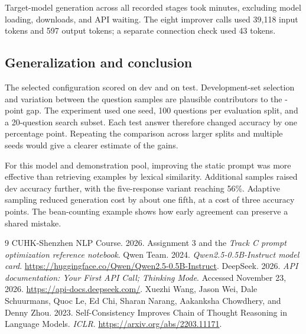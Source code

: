 \documentclass{article}
\begin{document}
Target-model generation across all recorded stages took \LocalMinutes{}
minutes, excluding model loading, downloads, and API waiting.
The eight improver calls used 39,118 input tokens and 597 output tokens;
a separate connection check used 43 tokens.

\subsection{Generalization and conclusion}
The selected configuration scored \FinalDev{} on dev and \FinalTest{} on
test. Development-set selection and variation between the question samples
are plausible contributors to the \FinalGap{}-point gap.
The experiment used one seed, 100 questions per evaluation split, and a
20-question search subset. Each test answer therefore changed accuracy by
one percentage point. Repeating the comparison across larger splits and
multiple seeds would give a clearer estimate of the gains.

For this model and demonstration pool, improving the static prompt was more
effective than retrieving examples by lexical similarity. Additional samples
raised dev accuracy further, with the five-response variant reaching 56\%.
Adaptive sampling reduced generation cost by about one fifth, at a cost of
three accuracy points. The bean-counting example shows how early agreement
can preserve a shared mistake.

\begin{thebibliography}{9}
 CUHK-Shenzhen NLP Course. 2026.
Assignment 3 and the \emph{Track C prompt optimization reference notebook}.
 Qwen Team. 2024.
\emph{Qwen2.5-0.5B-Instruct model card}.
\url{https://huggingface.co/Qwen/Qwen2.5-0.5B-Instruct}.
 DeepSeek. 2026.
\emph{API documentation: Your First API Call; Thinking Mode}.
Accessed November 23, 2026. \url{https://api-docs.deepseek.com/}.
 Xuezhi Wang, Jason Wei, Dale Schuurmans,
Quoc Le, Ed Chi, Sharan Narang, Aakanksha Chowdhery, and Denny Zhou. 2023.
Self-Consistency Improves Chain of Thought Reasoning in Language Models.
\emph{ICLR}. \url{https://arxiv.org/abs/2203.11171}.
\end{thebibliography}
\end{document}
